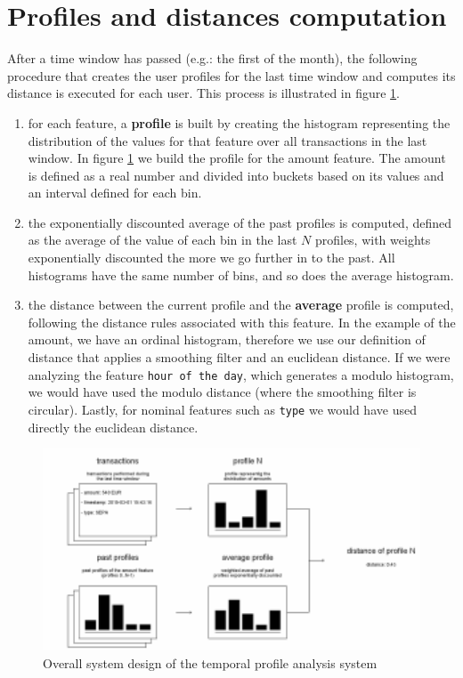 \section{Profiles and distances computation}

After a time window has passed (e.g.: the first of the month), the following procedure that creates the user profiles for the last time window and computes its distance is executed for each user. This process is illustrated in figure \ref{fig:distance_computation}.

\begin{enumerate}
  \item for each feature, a \textbf{profile} is built by creating the histogram representing the distribution of the values for that feature over all transactions in the last window. In figure \ref{fig:distance_computation} we build the profile for the amount feature. The amount is defined as a real number and divided into buckets based on its values and an interval defined for each bin.
  \item the exponentially discounted average of the past profiles is computed, defined as the average of the value of each bin in the last $N$ profiles, with weights exponentially discounted the more we go further in to the past. All histograms have the same number of bins, and so does the average histogram.
  \item the distance between the current profile and the \textbf{average} profile is computed, following the distance rules associated with this feature. In the example of the amount, we have an ordinal histogram, therefore we use our definition of distance that applies a smoothing filter and an euclidean distance. If we were analyzing the feature \texttt{hour of the day}, which generates a modulo histogram, we would have used the modulo distance (where the smoothing filter is circular). Lastly, for nominal features such as \texttt{type} we would have used directly the euclidean distance.
\end{enumerate}

\begin{figure}[h]
\centering
\includegraphics[width=450]{images/distance_computation.pdf}
\caption{Overall system design of the temporal profile analysis system}
\label{fig:distance_computation}
\end{figure}

